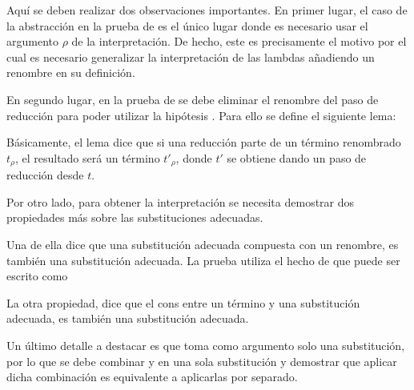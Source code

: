 
Aquí se deben realizar dos observaciones importantes.
En primer lugar, el caso de la abstracción en la prueba de  es el único lugar donde es necesario usar el argumento $\rho$ de la interpretación.
De hecho, este es precisamente el motivo por el cual es necesario generalizar la interpretación de las lambdas añadiendo un renombre en su definición.

En segundo lugar, en la prueba de  se debe eliminar el renombre del paso de reducción para poder utilizar la hipótesis .
Para ello se define el siguiente lema:


Básicamente, el lema dice que si una reducción parte de un término renombrado $t_\rho$, el resultado será un término $t'_\rho$, donde $t'$ se obtiene dando un paso de reducción desde $t$.


Por otro lado, para obtener la interpretación  se necesita demostrar dos propiedades más sobre las substituciones adecuadas.

Una de ella dice que una substitución adecuada compuesta con un renombre, es también una substitución adecuada.
La prueba utiliza el hecho de que   puede ser escrito como
\subst{\comp{\ids}{\bound{$\rho$}}}{}


La otra propiedad, dice que el cons entre un término \snstar y una substitución adecuada, es también una substitución adecuada.


Un último detalle a destacar es que  toma como argumento solo una substitución, por lo que se debe combinar \bound{$\sigma$} y
en una sola substitución y demostrar que aplicar dicha combinación es equivalente a aplicarlas por separado.



\begin{samepage}
\end{samepage}

